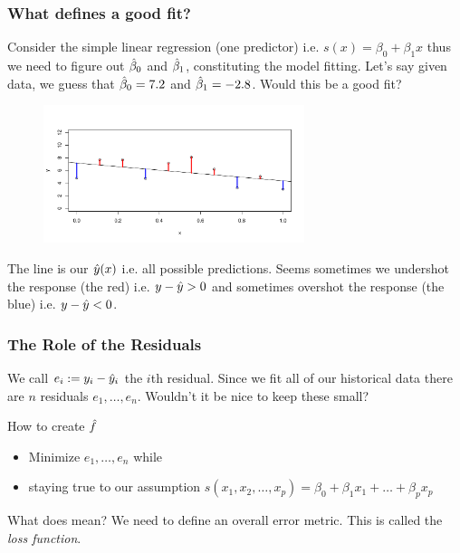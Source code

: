 \documentclass[slides]{beamer} %
\begin{document}
\begin{frame}\frametitle{What defines a good fit?}

\small

Consider the simple linear regression (one predictor) i.e. $s(x) = \beta_0 + \beta_1 x$ thus we need to figure out $\hat{\beta}_0$ and  $\hat{\beta}_1$, constituting the model fitting. Let's say given data, we guess that $\hat{\beta}_0 = 7.2$ and $\hat{\beta}_1 = -2.8$. Would this be a good fit?

\vspace{-0.5cm}
\begin{figure}
\centering\includegraphics[width=3.0in]{residuals}
\end{figure}

The line is our $\hat{y}(x)$ i.e. all possible predictions. Seems sometimes we undershot the response (the red) i.e. $y - \hat{y} > 0$ and sometimes overshot the response (the blue) i.e. $y - \hat{y} < 0$.

	
\end{frame}

\begin{frame}\frametitle{The Role of the Residuals}

We call $e_i := y_i - \hat{y}_i$ the $i$th residual. Since we fit all of our historical data there are $n$ residuals $e_1, \ldots, e_n$. Wouldn't it be nice to keep these small? \pause 

\begin{block}{How to create $\hat{f}$}
\begin{itemize}
\item Minimize $e_1, \ldots, e_n$ while
\item staying true to our assumption $s(x_1, x_2, \ldots, x_p) = \beta_0 + \beta_1 x_1 + \ldots + \beta_p x_p$
\end{itemize}
\end{block}

What does  mean? \pause  We need to define an overall error metric. This is called the \emph{loss function}.
	
\end{frame}
\end{document}
